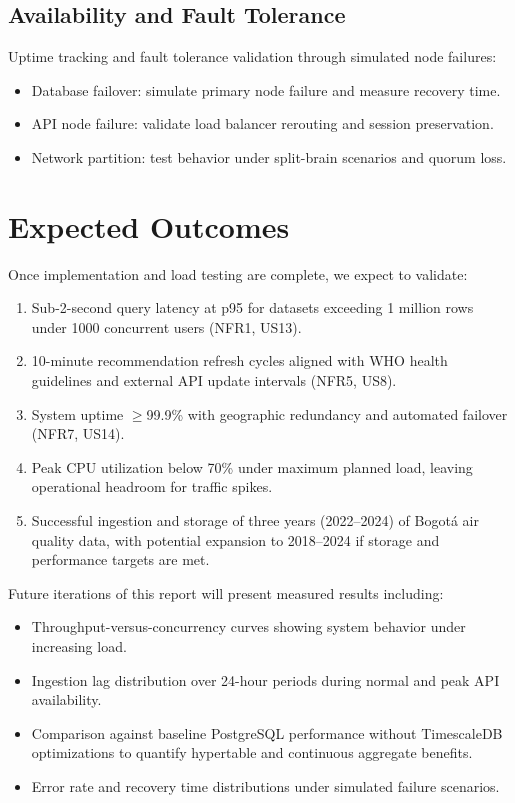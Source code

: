 \subsection{Availability and Fault Tolerance}
Uptime tracking and fault tolerance validation through simulated node failures:
\begin{itemize}
    \item Database failover: simulate primary node failure and measure recovery time.
    \item API node failure: validate load balancer rerouting and session preservation.
    \item Network partition: test behavior under split-brain scenarios and quorum loss.
\end{itemize}

\section{Expected Outcomes}
\label{sec:expected_outcomes}

Once implementation and load testing are complete, we expect to validate:
\begin{enumerate}
    \item Sub-2-second query latency at p95 for datasets exceeding 1 million rows under 1000 concurrent users (NFR1, US13).
    \item 10-minute recommendation refresh cycles aligned with WHO health guidelines and external API update intervals (NFR5, US8).
    \item System uptime $\geq$99.9\% with geographic redundancy and automated failover (NFR7, US14).
    \item Peak CPU utilization below 70\% under maximum planned load, leaving operational headroom for traffic spikes.
    \item Successful ingestion and storage of three years (2022--2024) of Bogotá air quality data, with potential expansion to 2018--2024 if storage and performance targets are met.
\end{enumerate}

Future iterations of this report will present measured results including:
\begin{itemize}
    \item Throughput-versus-concurrency curves showing system behavior under increasing load.
    \item Ingestion lag distribution over 24-hour periods during normal and peak API availability.
    \item Comparison against baseline PostgreSQL performance without TimescaleDB optimizations to quantify hypertable and continuous aggregate benefits.
    \item Error rate and recovery time distributions under simulated failure scenarios.
\end{itemize}



